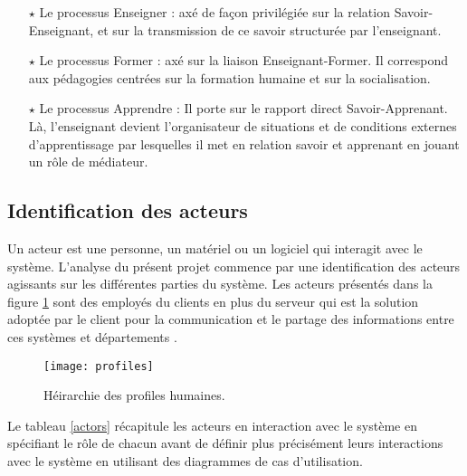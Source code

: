 \begin{itemize}
	
		\begin{itemize}	
		\item[$\star$] Le processus Enseigner : axé de façon privilégiée sur la relation Savoir-Enseignant, et sur
		la transmission de ce savoir structurée par l’enseignant.
		\item[$\star$] Le processus Former : axé sur la liaison Enseignant-Former. Il correspond aux pédagogies
		centrées sur la formation humaine et sur la socialisation.
     	\item[$\star$]Le processus Apprendre : Il porte sur le rapport direct Savoir-Apprenant. Là, l’enseignant
    	devient l’organisateur de situations et de conditions externes d’apprentissage par
    	lesquelles il met en relation savoir et apprenant en jouant un rôle de médiateur.
	
     \end{itemize}
\end{itemize}







\clearpage

\subsection{Identification des acteurs}
Un acteur est une personne, un matériel ou un logiciel qui interagit avec le système. L’analyse du présent projet commence par une identification des acteurs agissants sur les différentes parties du système. Les acteurs présentés dans la figure \ref{fig:profiles} sont des employés du clients en plus du serveur  qui est la solution adoptée par le client pour la communication et le partage des informations entre ces systèmes et départements .

\begin{figure}[ht]
  \centering
  \texttt{[image: profiles]}
  \caption{Héirarchie des profiles humaines.}
  \label{fig:profiles}
\end{figure}
\FloatBarrier
Le tableau \ref{actors} récapitule les acteurs en interaction avec le système en spécifiant le rôle de chacun avant de définir plus précisément leurs interactions avec le système en utilisant des diagrammes de cas d'utilisation.\\

